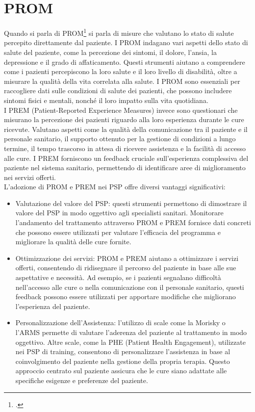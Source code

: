 \section{PROM}
Quando si parla di PROM\footcite{site:utilizzo-prom-prem} si parla di misure che valutano lo stato di salute percepito direttamente dal paziente. I PROM indagano vari aspetti dello stato di salute del paziente, come la percezione dei sintomi, il dolore, l'ansia, la depressione e il grado di affaticamento. Questi strumenti aiutano a comprendere come i pazienti percepiscono la loro salute e il loro livello di disabilità, oltre a misurare la qualità della vita correlata alla salute. I PROM sono essenziali per raccogliere dati sulle condizioni di salute dei pazienti, che possono includere sintomi fisici e mentali, nonché il loro impatto sulla vita quotidiana.\\
I PREM (Patient-Reported Experience Measures) invece sono questionari che misurano la percezione dei pazienti riguardo alla loro esperienza durante le cure ricevute. Valutano aspetti come la qualità della comunicazione tra il paziente e il personale sanitario, il supporto ottenuto per la gestione di condizioni a lungo termine, il tempo trascorso in attesa di ricevere assistenza e la facilità di accesso alle cure. I PREM forniscono un feedback cruciale sull'esperienza complessiva del paziente nel sistema sanitario, permettendo di identificare aree di miglioramento nei servizi offerti.\\
L'adozione di PROM e PREM nei PSP offre diversi vantaggi significativi:
\begin{itemize}
    \item Valutazione del valore del PSP: questi strumenti permettono di dimostrare il valore del PSP in modo oggettivo agli specialisti sanitari. Monitorare l'andamento del trattamento attraverso PROM e PREM fornisce dati concreti che possono essere utilizzati per valutare l'efficacia del programma e migliorare la qualità delle cure fornite.
    \item Ottimizzazione dei servizi: PROM e PREM aiutano a ottimizzare i servizi offerti, consentendo di ridisegnare il percorso del paziente in base alle sue aspettative e necessità. Ad esempio, se i pazienti segnalano difficoltà nell'accesso alle cure o nella comunicazione con il personale sanitario, questi feedback possono essere utilizzati per apportare modifiche che migliorano l'esperienza del paziente.
    \item Personalizzazione dell'Assistenza: l'utilizzo di scale come la Morisky o l'ARMS permette di valutare l'aderenza del paziente al trattamento in modo oggettivo. Altre scale, come la PHE (Patient Health Engagement), utilizzate nei PSP di training, consentono di personalizzare l'assistenza in base al coinvolgimento del paziente nella gestione della propria terapia. Questo approccio centrato sul paziente assicura che le cure siano adattate alle specifiche esigenze e preferenze del paziente.
\end{itemize}


